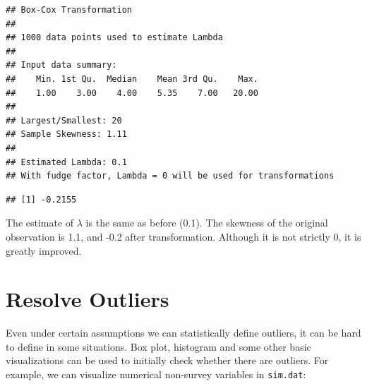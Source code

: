 \documentclass[
  12pt,
]{krantz}
\makeatletter
\newenvironment{Shaded}{\begin{snugshade}}{\end{snugshade}}
\newcommand{\FunctionTok}[1]{\textcolor[rgb]{0,0,0}{#1}}
\newcommand{\NormalTok}[1]{#1}
\newcommand{\OtherTok}[1]{\textcolor[rgb]{0.37,0.37,0.37}{#1}}
\newcommand{\SpecialCharTok}[1]{\textcolor[rgb]{0,0,0}{#1}}
\newenvironment{kframe}{%
\medskip{}
\setlength{\fboxsep}{.8em}
 \def\at@end@of@kframe{}%
 \ifinner\ifhmode%
  \def\at@end@of@kframe{\end{minipage}}%
  \begin{minipage}{\columnwidth}%
 \fi\fi%
 \def\FrameCommand##1{\hskip\@totalleftmargin \hskip-\fboxsep
 \colorbox{shadecolor}{##1}\hskip-\fboxsep
     \hskip-\linewidth \hskip-\@totalleftmargin \hskip\columnwidth}%
 \MakeFramed {\advance\hsize-\width
   \@totalleftmargin\z@ \linewidth\hsize
   \@setminipage}}%
 {\par\unskip\endMakeFramed%
 \at@end@of@kframe}
\renewenvironment{Shaded}{\begin{kframe}}{\end{kframe}}
\makeatother
\begin{document}
\begin{Shaded}
\end{Shaded}

\begin{verbatim}
## Box-Cox Transformation
## 
## 1000 data points used to estimate Lambda
## 
## Input data summary:
##    Min. 1st Qu.  Median    Mean 3rd Qu.    Max. 
##    1.00    3.00    4.00    5.35    7.00   20.00 
## 
## Largest/Smallest: 20 
## Sample Skewness: 1.11 
## 
## Estimated Lambda: 0.1 
## With fudge factor, Lambda = 0 will be used for transformations
\end{verbatim}

\begin{Shaded}
\end{Shaded}

\begin{verbatim}
## [1] -0.2155
\end{verbatim}

The estimate of \(\lambda\) is the same as before (0.1). The skewness of the original observation is 1.1, and -0.2 after transformation. Although it is not strictly 0, it is greatly improved.

\hypertarget{outliers}{%
\section{Resolve Outliers}\label{outliers}}

Even under certain assumptions we can statistically define outliers, it can be hard to define in some situations. Box plot, histogram and some other basic visualizations can be used to initially check whether there are outliers. For example, we can visualize numerical non-survey variables in \texttt{sim.dat}:
\end{document}
